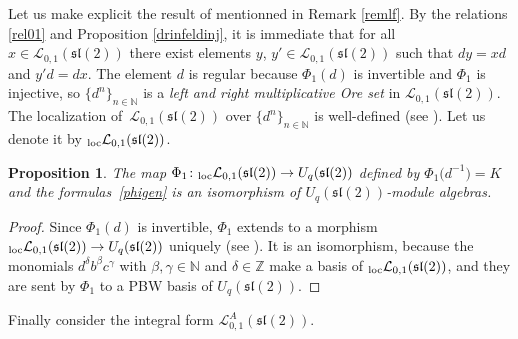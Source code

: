 \documentclass[pdftex]{sigma}%
\numberwithin{equation}{section}
\numberwithin{figure}{section}
\newtheorem{prop}[teo]{Proposition}
\newcommand{\mz}{\mathbb{Z}}
\newcommand{\mn}{\mathbb{N}}
\newcommand{\Ll}{{\mathcal L}}
\begin{document}
Let us make explicit the result of \cite{JL2} mentionned in Remark \ref{remlf}. By the relations \eqref{rel01} and Proposition \ref{drinfeldinj}, it is immediate that for all $x\in \Ll_{0,1}({\mathfrak{sl}}(2))$ there exist elements $y$, $y'\in \Ll_{0,1}({\mathfrak{sl}}(2))$ such that $dy = xd$ and $y'd=dx$. The element $d$ is regular because $\Phi_1(d)$ is invertible and $\Phi_1$ is injective, so $\{d^n\}_{n\in \mn}$ is a {\it left and right multiplicative Ore set} in $\Ll_{0,1}({\mathfrak{sl}}(2))$. The localization of~$\Ll_{0,1}({\mathfrak{sl}}(2))$ over $\{d^n\}_{n\in \mn}$ is well-defined (see \cite[Theorem 1.9 and Corollary 6.4]{GW}). Let us denote it by ${}_{\rm loc}\Ll_{0,1}({\mathfrak{sl}}(2))$.

\begin{prop}\label{Drinfeldloc} The map $\Phi_1\colon {}_{\rm loc}\Ll_{0,1}({\mathfrak{sl}}(2))\to U_q({\mathfrak{sl}}(2))$ defined by $\Phi_1\big(d^{-1}\big)=K$ and the formulas~\eqref{phigen} is an isomorphism of $U_q({\mathfrak{sl}}(2))$-module algebras.
\end{prop}

\begin{proof} Since $\Phi_1(d)$ is invertible, $\Phi_1$ extends to a morphism ${}_{\rm loc}\Ll_{0,1}({\mathfrak{sl}}(2)) \to U_q({\mathfrak{sl}}(2))$ uniquely (see \cite[Proposition~6.3]{GW}). It is an isomorphism, because the monomials $d^\delta b^\beta c^\gamma$ with $\beta,\gamma\in \mn$ and $\delta\in \mz$ make a basis of ${}_{\rm loc}\Ll_{0,1}({\mathfrak{sl}}(2))$, and they are sent by $\Phi_1$ to a PBW basis of $U_q({\mathfrak{sl}}(2))$.
\end{proof}

Finally consider the integral form $\Ll^A_{0,1}({\mathfrak{sl}}(2))$.
\end{document}
